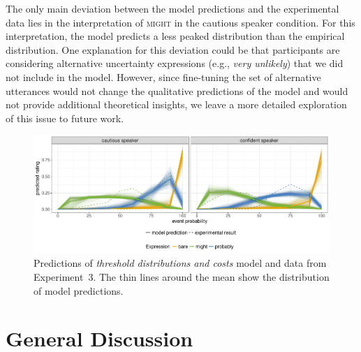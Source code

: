 \documentclass[man, floatsintext]{apa6}
\begin{document}
The only main deviation between the model predictions and the experimental data lies in the interpretation of \textsc{might} in the cautious speaker condition. For this interpretation, the model predicts a less peaked distribution than the empirical distribution.  One explanation for this deviation could be that participants are considering alternative uncertainty expressions (e.g., \textit{very unlikely}) that we did not include in the model.  However, since fine-tuning the set of alternative utterances would not change the qualitative predictions of the model and would not provide additional theoretical insights, we leave a more detailed exploration of this issue to future work. 

\begin{figure}
\includegraphics[width=\textwidth]{plots/adaptation-posterior-comp-data.pdf}
\caption{Predictions of \textit{threshold distributions and costs} model and data from Experiment~3. The thin lines around the mean show the distribution of model predictions.  \label{fig:post-exposure-comp-data}}
\end{figure}

\section{General Discussion}

\end{document}
